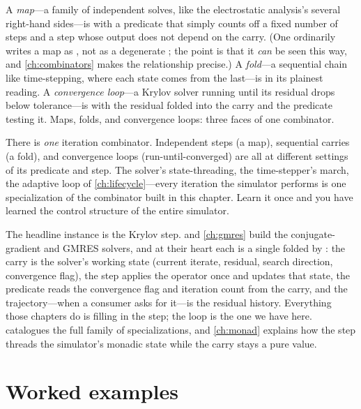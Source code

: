 A \emph{map}---a family of independent solves, like the electrostatic analysis's
several right-hand sides---is  with a predicate that simply
counts off a fixed number of steps and a step whose output does not depend on the
carry. (One ordinarily writes a map as , not as a degenerate
; the point is that it \emph{can} be seen this way, and
\cref{ch:combinators} makes the relationship precise.) A \emph{fold}---a
sequential chain like time-stepping, where each state comes from the last---is
 in its plainest reading. A \emph{convergence loop}---a
Krylov solver running until its residual drops below tolerance---is
 with the residual folded into the carry and the predicate
testing it. Maps, folds, and convergence loops: three faces of one combinator.

\begin{keyidea}
There is \emph{one} iteration combinator. Independent steps (a map), sequential
carries (a fold), and convergence loops (run-until-converged) are all
 at different settings of its predicate and step. The
solver's state-threading, the time-stepper's march, the adaptive loop of
\cref{ch:lifecycle}---every iteration the simulator performs is one specialization
of the combinator built in this chapter. Learn it once and you have learned the
control structure of the entire simulator.
\end{keyidea}

The headline instance is the Krylov step.  and \cref{ch:gmres} build
the conjugate-gradient and GMRES solvers, and at their heart each is a single
 folded by : the carry is the solver's
working state (current iterate, residual, search direction, convergence flag),
the step applies the operator once and updates that state, the predicate reads
the convergence flag and iteration count from the carry, and the trajectory---when
a consumer asks for it---is the residual history. Everything those chapters do is
filling in the step; the loop is the one we have here. 
catalogues the full family of specializations, and \cref{ch:monad} explains how
the step threads the simulator's monadic state while the carry stays a pure value.

\section{Worked examples}

